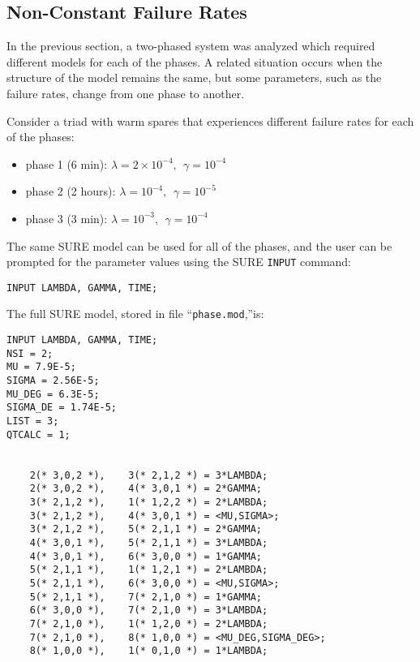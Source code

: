 \subsection{Non-Constant Failure Rates} 
 
In the previous section, a two-phased system was analyzed which
required different models for each of the phases.  A related situation
occurs when the structure of the model remains the same, but some
parameters, such as the failure rates, change from one phase to another.

     Consider a triad with warm spares that experiences different failure 
rates for each of the phases:
\begin{itemize}
\item{phase 1 (6 min):} $\lambda = 2 \times 10^{-4},~~ \gamma = 10^{-4}$

\item{phase 2 (2 hours):} $\lambda = 10^{-4},~~ \gamma = 10^{-5}$

\item{phase 3 (3 min):} $\lambda = 10^{-3},~~ \gamma = 10^{-4}$
\end{itemize}

The same SURE model can be used for all of the phases, and the user can be 
prompted for the parameter values using the SURE \verb`INPUT` command:
\begin{verbatim}
INPUT LAMBDA, GAMMA, TIME;
\end{verbatim}

The full SURE model, stored in file ``\verb!phase.mod!,''is:
\begin{verbatim}
INPUT LAMBDA, GAMMA, TIME;
NSI = 2;
MU = 7.9E-5;
SIGMA = 2.56E-5;
MU_DEG = 6.3E-5;
SIGMA_DE = 1.74E-5;
LIST = 3;
QTCALC = 1;


    2(* 3,0,2 *),    3(* 2,1,2 *) = 3*LAMBDA;
    2(* 3,0,2 *),    4(* 3,0,1 *) = 2*GAMMA;
    3(* 2,1,2 *),    1(* 1,2,2 *) = 2*LAMBDA;
    3(* 2,1,2 *),    4(* 3,0,1 *) = <MU,SIGMA>;
    3(* 2,1,2 *),    5(* 2,1,1 *) = 2*GAMMA;
    4(* 3,0,1 *),    5(* 2,1,1 *) = 3*LAMBDA;
    4(* 3,0,1 *),    6(* 3,0,0 *) = 1*GAMMA;
    5(* 2,1,1 *),    1(* 1,2,1 *) = 2*LAMBDA;
    5(* 2,1,1 *),    6(* 3,0,0 *) = <MU,SIGMA>;
    5(* 2,1,1 *),    7(* 2,1,0 *) = 1*GAMMA;
    6(* 3,0,0 *),    7(* 2,1,0 *) = 3*LAMBDA;
    7(* 2,1,0 *),    1(* 1,2,0 *) = 2*LAMBDA;
    7(* 2,1,0 *),    8(* 1,0,0 *) = <MU_DEG,SIGMA_DEG>;
    8(* 1,0,0 *),    1(* 0,1,0 *) = 1*LAMBDA;

\end{verbatim}

